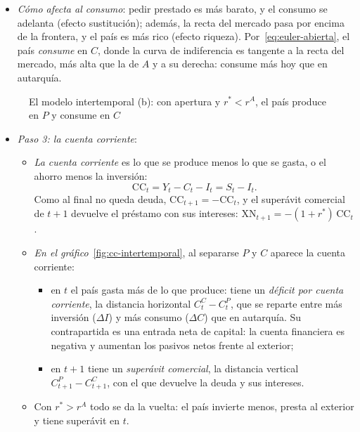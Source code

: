 \documentclass[11pt]{article}
\begin{document}
\begin{itemize}
\begin{itemize}
  \item \emph{Cómo afecta al consumo}: pedir prestado es más barato, y el consumo se adelanta (efecto sustitución); además, la recta del mercado pasa por encima de la frontera, y el país es más rico (efecto riqueza). Por~\eqref{eq:euler-abierta}, el país \emph{consume} en $C$, donde la curva de indiferencia es tangente a la recta del mercado, más alta que la de $A$ y a su derecha: consume más hoy que en autarquía.
  \end{itemize}
\end{itemize}

\begin{figure}[H]
\centering
\caption{El modelo intertemporal (b): con apertura y $r^*<r^A$, el país produce en $P$ y consume en $C$}\label{fig:cc-intertemporal-b}
\end{figure}

\begin{itemize}
\item \emph{Paso 3: la cuenta corriente}:
  \begin{itemize}
  \item \emph{La cuenta corriente} es lo que se produce menos lo que se gasta, o el ahorro menos la inversión:
    \begin{equation}\label{eq:cc-intertemporal}
    \mathrm{CC}_t=Y_t-C_t-I_t=S_t-I_t .
    \end{equation}
    Como al final no queda deuda, $\mathrm{CC}_{t+1}=-\mathrm{CC}_t$, y el superávit comercial de $t+1$ devuelve el préstamo con sus intereses: $\mathrm{XN}_{t+1}=-(1+r^*)\,\mathrm{CC}_t$.
  \item \emph{En el gráfico}~\ref{fig:cc-intertemporal}, al separarse $P$ y $C$ aparece la cuenta corriente:
    \begin{itemize}
    \item en $t$ el país gasta más de lo que produce: tiene un \emph{déficit por cuenta corriente}, la distancia horizontal $C^C_t-C^P_t$, que se reparte entre más inversión ($\Delta I$) y más consumo ($\Delta C$) que en autarquía. Su contrapartida es una entrada neta de capital: la cuenta financiera es negativa y aumentan los pasivos netos frente al exterior;
    \item en $t+1$ tiene un \emph{superávit comercial}, la distancia vertical $C^P_{t+1}-C^C_{t+1}$, con el que devuelve la deuda y sus intereses.
    \end{itemize}
  \item Con $r^*>r^A$ todo se da la vuelta: el país invierte menos, presta al exterior y tiene superávit en $t$.
  \end{itemize}
\end{itemize}
\end{document}
